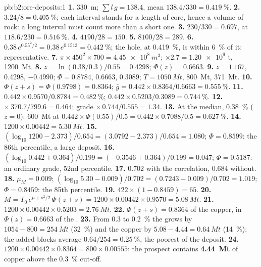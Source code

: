 \begin{solution}{pb:b2:ore-deposits:1}
\textbf{1.} \qty{330}{m}; $\sum l\,g = 138.4$, mean $138.4/330 = \qty{0.419}{\percent}$.
\textbf{2.} $3.24/8 = \qty{0.405}{\percent}$; each interval stands for a length of core, hence a
volume of rock: a long interval must count more than a short one.
\textbf{3.} $230/330 = 0.697$, at $118.6/230 = \qty{0.516}{\percent}$.
\textbf{4.} $4190/28 = 150$.
\textbf{5.} $8100/28 = 289$.
\textbf{6.} $0.38\,e^{0.55^2/2} = 0.38\,e^{0.1513} = \qty{0.442}{\percent}$; the hole, at
\qty{0.419}{\percent}, is within \qty{6}{\percent} of it: representative.
\textbf{7.} $\pi \times 450^2 \times 700 = \qty{4.45e8}{m^3}$; $\times 2.7 = \num{1.20e9}$ t,
\qty{1200}{Mt}.
\textbf{8.} $z = \ln(0.38/0.3)/0.55 = 0.4298$; $\Phi(z) = 0.6663$.
\textbf{9.} $z = 1.167$, 0.4298, $-0.4990$; $\Phi = 0.8784$, 0.6663, 0.3089; $T = \qty{1050}{Mt}$,
\qty{800}{Mt}, \qty{371}{Mt}.
\textbf{10.} $\Phi(z + s) = \Phi(0.9798) = 0.8364$; $\bar g = 0.442 \times 0.8364/0.6663 =
\qty{0.555}{\percent}$.
\textbf{11.} $0.442 \times 0.9570/0.8784 = \qty{0.482}{\percent}$; $0.442 \times 0.5203/0.3089 =
\qty{0.744}{\percent}$.
\textbf{12.}  $\times\, 370.7/799.6 = 0.464$; grade $\times\, 0.744/0.555 = 1.34$.
\textbf{13.} At the median, \qty{0.38}{\percent} ($z = 0$): \qty{600}{Mt} at $0.442 \times
\Phi(0.55)/0.5 = 0.442 \times 0.7088/0.5 = \qty{0.627}{\percent}$.
\textbf{14.} $1200 \times 0.00442 = \qty{5.30}{Mt}$.
\textbf{15.} $(\log_{10} 1200 - 2.373)/0.654 = (3.0792 - 2.373)/0.654 = 1.080$; $\Phi = 0.8599$: the
86th percentile, a large deposit.
\textbf{16.} $(\log_{10} 0.442 + 0.364)/0.199 = (-0.3546 + 0.364)/0.199 = 0.047$; $\Phi = 0.5187$: an
ordinary grade, 52nd percentile.
\textbf{17.} 0.702 with the correlation, 0.684 without.
\textbf{18.} $\mu_M = 0.009$; $(\log_{10} 5.30 - 0.009)/0.702 = (0.7243 - 0.009)/0.702 = 1.019$; $\Phi =
0.8459$: the 85th percentile.
\textbf{19.} $422 \times (1 - 0.8459) = 65$.
\textbf{20.} $M = T_0\,e^{\mu + s^2/2}\,\Phi(z + s) = 1200 \times 0.00442 \times 0.9570 =
\qty{5.08}{Mt}$.
\textbf{21.} $1200 \times 0.00442 \times 0.5203 = \qty{2.76}{Mt}$.
\textbf{22.} $\Phi(z + s) = 0.8364$ of the copper, in $\Phi(z) = 0.6663$ of the .
\textbf{23.} From 0.3 to \qty{0.2}{\percent} the  grows by $1054 - 800 = \qty{254}{Mt}$
(\qty{32}{\percent}) and the copper by $5.08 - 4.44 = \qty{0.64}{Mt}$ (\qty{14}{\percent}): the added
blocks average $0.64/254 = \qty{0.25}{\percent}$, the poorest of the deposit.
\textbf{24.} $1200 \times 0.00442 \times 0.8364 = 800 \times 0.00555$: the prospect contains
\textbf{\qty[text-series-to-math=true]{4.44}{Mt}} of copper above the \qty{0.3}{\percent} cut-off.
\end{solution}
